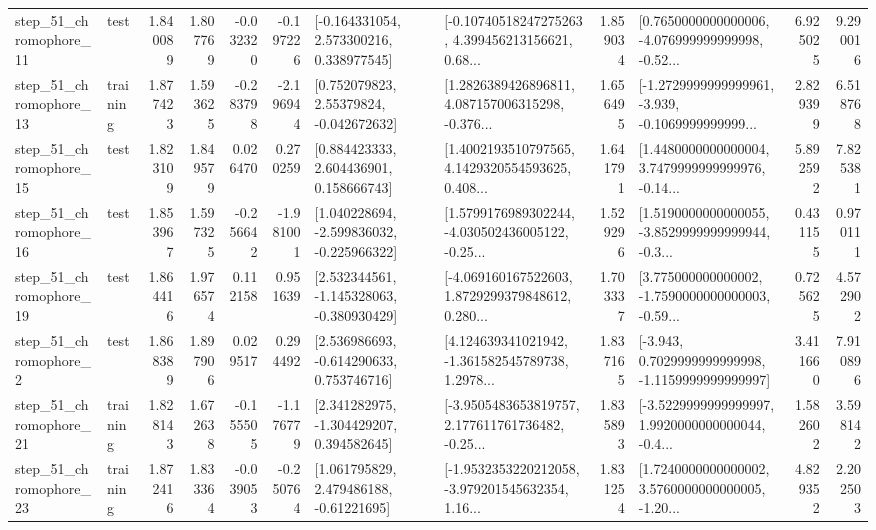 \begin{tabular}{llrrrrllrlrr}
   step\_51\_chromophore\_11 &      test &      1.840089 &    1.807769 &     -0.032320 & -0.197226 &    [-0.164331054, 2.573300216, 0.338977545] &  [-0.10740518247275263, 4.399456213156621, 0.68... &       1.859034 &  [0.7650000000000006, -4.076999999999998, -0.52... &            6.925025 &          9.290016 \\
   step\_51\_chromophore\_13 &  training &      1.877423 &    1.593625 &     -0.283798 & -2.196944 &     [0.752079823, 2.55379824, -0.042672632] &  [1.2826389426896811, 4.087157006315298, -0.376... &       1.656495 &  [-1.2729999999999961, -3.939, -0.1069999999999... &            2.829399 &          6.518768 \\
   step\_51\_chromophore\_15 &      test &      1.823109 &    1.849579 &      0.026470 &  0.270259 &     [0.884423333, 2.604436901, 0.158666743] &  [1.4002193510797565, 4.1429320554593625, 0.408... &       1.641791 &  [1.4480000000000004, 3.7479999999999976, -0.14... &            5.892592 &          7.825381 \\
   step\_51\_chromophore\_16 &      test &      1.853967 &    1.597325 &     -0.256642 & -1.981001 &   [1.040228694, -2.599836032, -0.225966322] &  [1.5799176989302244, -4.030502436005122, -0.25... &       1.529296 &  [1.5190000000000055, -3.8529999999999944, -0.3... &            0.431155 &          0.970111 \\
   step\_51\_chromophore\_19 &      test &      1.864416 &    1.976574 &      0.112158 &  0.951639 &   [2.532344561, -1.145328063, -0.380930429] &  [-4.069160167522603, 1.8729299379848612, 0.280... &       1.703337 &  [3.775000000000002, -1.7590000000000003, -0.59... &            0.725625 &          4.572902 \\
    step\_51\_chromophore\_2 &      test &      1.868389 &    1.897906 &      0.029517 &  0.294492 &    [2.536986693, -0.614290633, 0.753746716] &  [4.124639341021942, -1.361582545789738, 1.2978... &       1.837165 &  [-3.943, 0.7029999999999998, -1.1159999999999997] &            3.411660 &          7.910896 \\
   step\_51\_chromophore\_21 &  training &      1.828143 &    1.672638 &     -0.155505 & -1.176779 &    [2.341282975, -1.304429207, 0.394582645] &  [-3.9505483653819757, 2.177611761736482, -0.25... &       1.835893 &  [-3.5229999999999997, 1.9920000000000044, -0.4... &            1.582602 &          3.598142 \\
   step\_51\_chromophore\_23 &  training &      1.872416 &    1.833364 &     -0.039053 & -0.250764 &     [1.061795829, 2.479486188, -0.61221695] &  [-1.9532353220212058, -3.979201545632354, 1.16... &       1.831254 &  [1.7240000000000002, 3.5760000000000005, -1.20... &            4.829352 &          2.202503 \\

\end{tabular}

